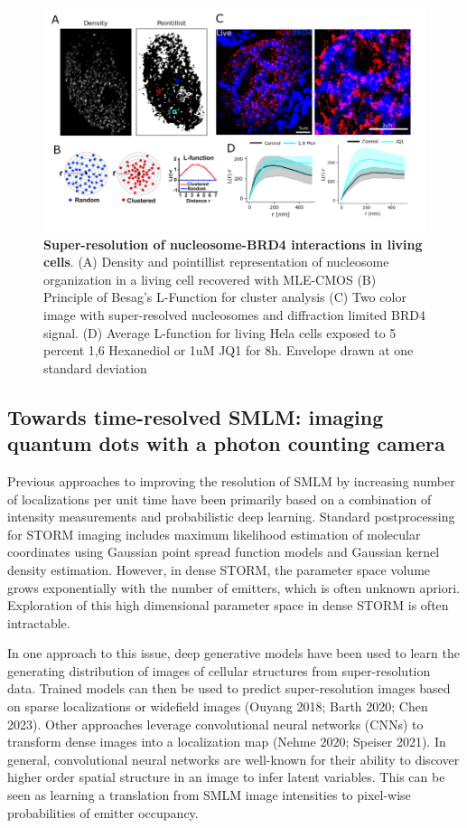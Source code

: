\documentclass{ucetd}
\begin{document}
\begin{figure}
\begin{center}
\includegraphics[width=17cm]{BRD4-Results.png}
\end{center}
\caption{\textbf{Super-resolution of nucleosome-BRD4 interactions in living cells}. (A) Density and pointillist representation of nucleosome organization in a living cell recovered with MLE-CMOS (B) Principle of Besag's L-Function for cluster analysis (C) Two color image with super-resolved nucleosomes and diffraction limited BRD4 signal. (D) Average L-function for living Hela cells exposed to 5 percent 1,6 Hexanediol or 1uM JQ1 for 8h. Envelope drawn at one standard deviation}
\end{figure}

\subsection{Towards time-resolved SMLM: imaging quantum dots with a photon counting camera}

Previous approaches to improving the resolution of SMLM by increasing number of localizations per unit time have been primarily based on a combination of intensity measurements and probabilistic deep learning. Standard postprocessing for STORM imaging includes maximum likelihood estimation of molecular coordinates using Gaussian point spread function models and Gaussian kernel density estimation. However, in dense STORM, the parameter space volume grows exponentially with the number of emitters, which is often unknown apriori. Exploration of this high dimensional parameter space in dense STORM is often intractable. 

In one approach to this issue, deep generative models have been used to learn the generating distribution of images of cellular structures from super-resolution data. Trained models can then be used to predict super-resolution images based on sparse localizations or widefield images (Ouyang 2018; Barth 2020; Chen 2023). Other approaches leverage convolutional neural networks (CNNs) to transform dense images into a localization map (Nehme 2020; Speiser 2021). In general, convolutional neural networks are well-known for their ability to discover higher order spatial structure in an image to infer latent variables. This can be seen as learning a translation from SMLM image intensities to pixel-wise probabilities of emitter occupancy. 
\end{document}
